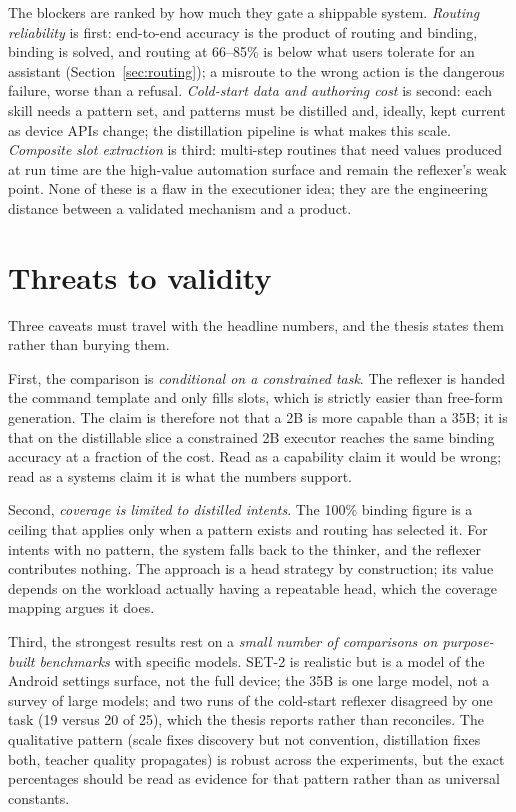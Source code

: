 The blockers are ranked by how much they gate a shippable system. \emph{Routing
reliability} is first: end-to-end accuracy is the product of routing and binding,
binding is solved, and routing at 66--85\% is below what users tolerate for an
assistant (Section~\ref{sec:routing}); a misroute to the wrong action is the
dangerous failure, worse than a refusal. \emph{Cold-start data and authoring cost}
is second: each skill needs a pattern set, and patterns must be distilled and,
ideally, kept current as device APIs change; the distillation pipeline is what
makes this scale. \emph{Composite slot extraction} is third: multi-step routines
that need values produced at run time are the high-value automation surface and
remain the reflexer's weak point. None of these is a flaw in the executioner idea;
they are the engineering distance between a validated mechanism and a product.

\section{Threats to validity}
\label{sec:d-threats}

Three caveats must travel with the headline numbers, and the thesis states them
rather than burying them.

First, the comparison is \emph{conditional on a constrained task}. The reflexer is
handed the command template and only fills slots, which is strictly easier than
free-form generation. The claim is therefore not that a 2B is more capable than a
35B; it is that on the distillable slice a constrained 2B executor reaches the
same binding accuracy at a fraction of the cost. Read as a capability claim it
would be wrong; read as a systems claim it is what the numbers support.

Second, \emph{coverage is limited to distilled intents}. The 100\% binding figure
is a ceiling that applies only when a pattern exists and routing has selected it.
For intents with no pattern, the system falls back to the thinker, and the
reflexer contributes nothing. The approach is a head strategy by construction; its
value depends on the workload actually having a repeatable head, which the
coverage mapping argues it does.

Third, the strongest results rest on a \emph{small number of comparisons on
purpose-built benchmarks} with specific models. SET-2 is realistic but is a model
of the Android settings surface, not the full device; the 35B is one large model,
not a survey of large models; and two runs of the cold-start reflexer disagreed by
one task (19 versus 20 of 25), which the thesis reports rather than reconciles. The
qualitative pattern (scale fixes discovery but not convention, distillation fixes
both, teacher quality propagates) is robust across the experiments, but the exact
percentages should be read as evidence for that pattern rather than as universal
constants.

